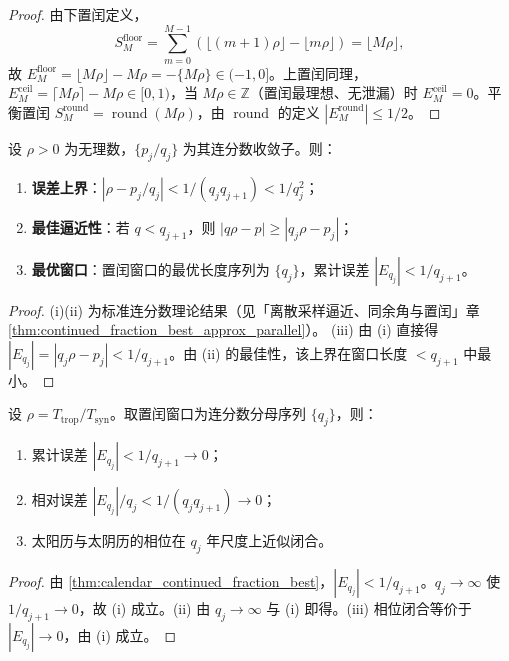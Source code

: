 \begin{proof}
由下置闰定义，
\[
S_M^{\mathrm{floor}}=\sum_{m=0}^{M-1}(\lfloor (m+1)\rho\rfloor-\lfloor m\rho\rfloor)=\lfloor M\rho\rfloor,
\]
故 \(E_M^{\mathrm{floor}}=\lfloor M\rho\rfloor-M\rho=-\{M\rho\}\in(-1,0]\)。上置闰同理，\(E_M^{\mathrm{ceil}}=\lceil M\rho\rceil-M\rho\in[0,1)\)，当 \(M\rho\in\mathbb Z\)（置闰最理想、无泄漏）时 \(E_M^{\mathrm{ceil}}=0\)。平衡置闰 \(S_M^{\mathrm{round}}=\operatorname{round}(M\rho)\)，由 \(\operatorname{round}\) 的定义 \(|E_M^{\mathrm{round}}|\le 1/2\)。
\end{proof}

\begin{theorem}[连分数最佳置闰]\label{thm:calendar_continued_fraction_best}
设 \(\rho>0\) 为无理数，\(\{p_j/q_j\}\) 为其连分数收敛子。则：
\begin{enumerate}[label=(\roman*)]
    \item \textbf{误差上界}：\(|\rho-p_j/q_j|<1/(q_jq_{j+1})<1/q_j^2\)；
    \item \textbf{最佳逼近性}：若 \(q<q_{j+1}\)，则 \(|q\rho-p|\ge|q_j\rho-p_j|\)；
    \item \textbf{最优窗口}：置闰窗口的最优长度序列为 \(\{q_j\}\)，累计误差 \(|E_{q_j}|<1/q_{j+1}\)。
\end{enumerate}
\end{theorem}

\begin{proof}
(i)(ii) 为标准连分数理论结果（见「离散采样逼近、同余角与置闰」章 \cref{thm:continued_fraction_best_approx_parallel}）。
(iii) 由 (i) 直接得 \(|E_{q_j}|=|q_j\rho-p_j|<1/q_{j+1}\)。由 (ii) 的最佳性，该上界在窗口长度 \(<q_{j+1}\) 中最小。
\end{proof}

\begin{theorem}[历法置闰的收敛性]\label{thm:calendar_intercalation_convergence}
设 \(\rho=T_{\text{trop}}/T_{\text{syn}}\)。取置闰窗口为连分数分母序列 \(\{q_j\}\)，则：
\begin{enumerate}[label=(\roman*)]
    \item 累计误差 \(|E_{q_j}|<1/q_{j+1}\to 0\)；
    \item 相对误差 \(|E_{q_j}|/q_j<1/(q_jq_{j+1})\to 0\)；
    \item 太阳历与太阴历的相位在 \(q_j\) 年尺度上近似闭合。
\end{enumerate}
\end{theorem}

\begin{proof}
由 \cref{thm:calendar_continued_fraction_best}，\(|E_{q_j}|<1/q_{j+1}\)。\(q_j\to\infty\) 使 \(1/q_{j+1}\to 0\)，故 (i) 成立。(ii) 由 \(q_j\to\infty\) 与 (i) 即得。(iii) 相位闭合等价于 \(|E_{q_j}|\to 0\)，由 (i) 成立。
\end{proof}

